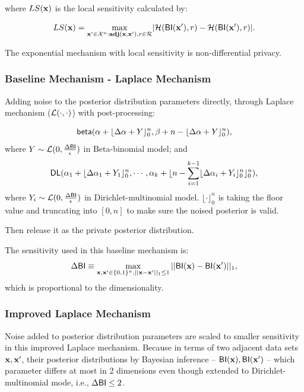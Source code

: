 \documentclass{article}
\begin{document}
where $LS(\textbf{x})$ is the local sensitivity calculated by:

\begin{equation*}
LS(\textbf{x})=\max_{\textbf{x}' \in \mathcal{X}^n:\textbf{adj}(\textbf{x},\textbf{x}'), r\in \mathcal{R}}\lvert \mathcal{H}(\mathsf{BI}(\textbf{x}'), r) - \mathcal{H}(\mathsf{BI}(\textbf{x}'), r)\rvert.
\end{equation*}

The exponential mechanism with local sensitivity is non-differential privacy\cite{dwork2014algorithmic}.



\subsubsection{Baseline Mechanism - Laplace Mechanism}
 Adding noise to the posterior distribution parameters directly, through Laplace mechanism ($\mathcal{L}(\cdot, \cdot)$) with post-processing:

 \[
 \mathsf{beta}(\alpha +  \lfloor{\Delta \alpha + Y}\rfloor^n_0,\beta + n - \lfloor{\Delta \alpha + Y}\rfloor^n_0),
 \] 
 where $Y \sim \mathcal{L}(0, \frac{\Delta \mathsf{BI}}{\epsilon})$ in Beta-binomial model; and
 \[
 \mathsf{DL}(\alpha_1 +  \lfloor{\Delta \alpha_1 + Y_1}\rfloor^n_0, \cdots, \alpha_k + \lfloor n - \sum_{i = 1}^{k-1}\lfloor{\Delta \alpha_i + Y_i}\rfloor^n_0 \rfloor^n_0),
 \]
 where $Y_i \sim \mathcal{L}(0, \frac{\Delta \mathsf{BI}}{\epsilon})$ in Dirichlet-multinomial model. $\lfloor \cdot \rfloor^n_0$ is taking the floor value and truncating into $[0,n]$ to make sure the noised posterior is valid.

 Then release it as the private posterior distribution.

 The sensitivity used in this baseline mechanism is:
 \[
 \Delta \mathsf{BI} \equiv \max\limits_{\textbf{x}, \textbf{x}' \in \{0,1\}^{n}, ||\textbf{x} - \textbf{x}'||_1 \leq 1} ||\mathsf{BI}(\textbf{x}) - \mathsf{BI}(\textbf{x}')||_1,
 \]
 which is proportional to the dimensionality.


\subsubsection{Improved Laplace Mechanism}

 Noise added to posterior distribution parameters are scaled to smaller sensitivity in this improved Laplace mechanism. Because in terms of two adjacent data sets $\textbf{x}, \textbf{x}'$, their posterior distributions by Bayesian inference -- $\mathsf{BI}(\textbf{x}), \mathsf{BI}(\textbf{x}')$ -- which parameter differs at most in 2 dimensions even though extended to Dirichlet-multinomial mode, i.e., $\Delta \mathsf{BI} \leq 2$. 
\end{document}

